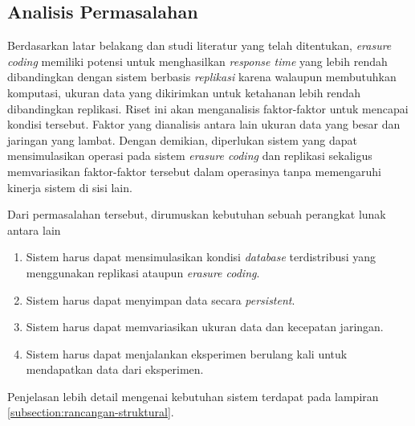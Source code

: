 \subsection{Analisis Permasalahan}
\label{subsection:analisis-permasalahan}


Berdasarkan latar belakang dan studi literatur yang telah ditentukan, \textit{erasure coding} memiliki potensi untuk menghasilkan \textit{response time} yang lebih rendah dibandingkan dengan sistem berbasis \textit{replikasi} karena walaupun membutuhkan komputasi, ukuran data yang dikirimkan untuk ketahanan lebih rendah dibandingkan replikasi. Riset ini akan menganalisis faktor-faktor untuk mencapai kondisi tersebut. Faktor yang dianalisis antara lain ukuran data yang besar dan jaringan yang lambat. Dengan demikian, diperlukan sistem yang dapat mensimulasikan operasi pada sistem \textit{erasure coding} dan replikasi sekaligus memvariasikan faktor-faktor tersebut dalam operasinya tanpa memengaruhi kinerja sistem di sisi lain.

Dari permasalahan tersebut, dirumuskan kebutuhan sebuah perangkat lunak antara lain
\begin{enumerate}

    \item Sistem harus dapat mensimulasikan kondisi \textit{database} terdistribusi yang menggunakan replikasi ataupun \textit{erasure coding}.
    \item Sistem harus dapat menyimpan data secara \textit{persistent}.
    \item Sistem harus dapat memvariasikan ukuran data dan kecepatan jaringan.
    \item Sistem harus dapat menjalankan eksperimen berulang kali untuk mendapatkan data dari eksperimen.

\end{enumerate}

Penjelasan lebih detail mengenai kebutuhan sistem terdapat pada lampiran \ref{subsection:rancangan-struktural}.
